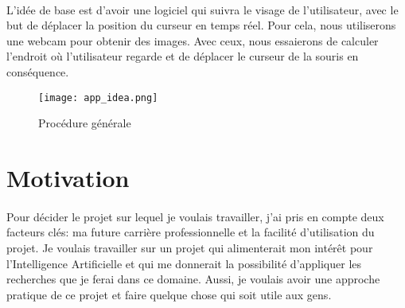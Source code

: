 \paragraph{}
L'idée de base est d'avoir une logiciel qui suivra le visage de l'utilisateur, avec le but de déplacer la position du curseur en temps réel.
Pour cela, nous utiliserons une webcam pour obtenir des images.
Avec ceux, nous essaierons de calculer l'endroit où l'utilisateur regarde et de déplacer le curseur de la souris en conséquence.
\begin{figure}[H]
    \centering
    \texttt{[image: app\_idea.png]}
    \caption{Procédure générale}
\end{figure}

\section{Motivation}
\paragraph{}
Pour décider le projet sur lequel je voulais travailler, j'ai pris en compte deux facteurs clés: ma future carrière professionnelle et la facilité d'utilisation du projet.
Je voulais travailler sur un projet qui alimenterait mon intérêt pour l'Intelligence Artificielle et qui me donnerait la possibilité d'appliquer les recherches que je ferai dans ce domaine.
Aussi, je voulais avoir une approche pratique de ce projet et faire quelque chose qui soit utile aux gens.
